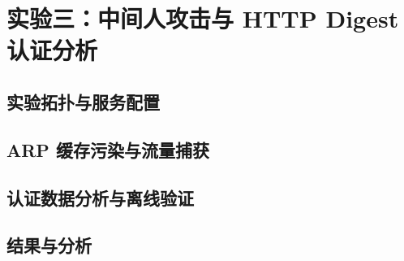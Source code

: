 \section{实验三：中间人攻击与 HTTP Digest 认证分析}

\subsection{实验拓扑与服务配置}

\subsection{ARP 缓存污染与流量捕获}

\subsection{认证数据分析与离线验证}

\subsection{结果与分析}
